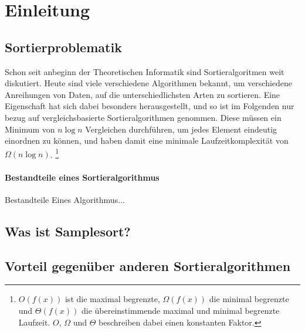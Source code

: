 \section{Einleitung}
	\subsection{Sortierproblematik}
	Schon seit anbeginn der Theoretischen Informatik sind Sortieralgoritmen weit diskutiert.
	Heute sind viele verschiedene Algorithmen bekannt, um verschiedene Anreihungen von Daten, auf die unterschiedlichsten Arten zu sortieren.
	Eine Eigenschaft hat sich dabei besonders herausgestellt, und so ist im Folgenden nur bezug auf vergleichsbasierte Sortieralgorithmen genommen.
	Diese m\"ussen ein Minimum von $n\log{n}$ Vergleichen durchführen, um jedes Element eindeutig einordnen zu k\"onnen, und haben damit eine minimale Laufzeitkomplexit\"at von $\Omega(n\log{n})$.
	\footnote{$O(f(x))$ ist die maximal begrenzte, $\Omega(f(x))$ die minimal begrenzte und $\Theta(f(x))$ die übereinstimmende maximal und minimal begrenzte Laufzeit. $O$, $\Omega$ und $\Theta$ beschreiben dabei einen konstanten Faktor.}
	
	\paragraph{Bestandteile eines Sortieralgorithmus}
	Bestandteile Eines Algorithmus...

    \subsection{Was ist Samplesort?}
	
    \subsection{Vorteil gegenüber anderen Sortieralgorithmen}
